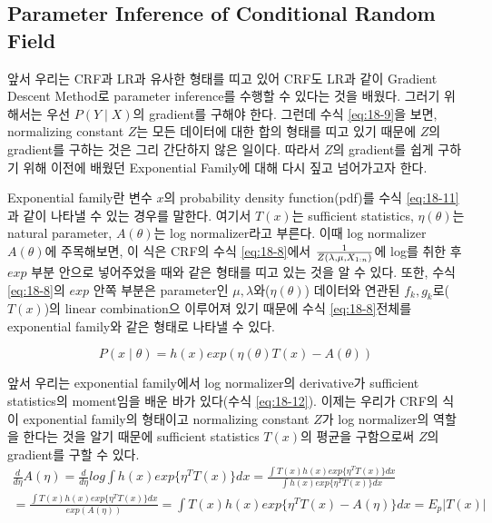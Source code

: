 \documentclass[draft=false]{oblivoir}
\begin{document}
\subsection{Parameter Inference of Conditional Random Field}
앞서 우리는 CRF과 LR과 유사한 형태를 띠고 있어 CRF도 LR과 같이 Gradient Descent Method로 parameter inference를 수행할 수 있다는 것을 배웠다. 그러기 위해서는 우선 $P(Y\mid X)$의 gradient를 구해야 한다. 그런데 수식 \ref{eq:18-9}을 보면, normalizing constant $Z$는 모든 데이터에 대한 합의 형태를 띠고 있기 때문에 $Z$의 gradient를 구하는 것은 그리 간단하지 않은 일이다. 따라서 $Z$의 gradient를 쉽게 구하기 위해 이전에 배웠던 Exponential Family에 대해 다시 짚고 넘어가고자 한다. 

Exponential family란 변수 $x$의 probability density function(pdf)를 수식 \ref{eq:18-11}과 같이 나타낼 수 있는 경우를 말한다. 여기서 $T(x)$는 sufficient statistics, $\eta(\theta)$는 natural parameter, $A(\theta)$는 log normalizer라고 부른다. 이때 log normalizer $A(\theta)$에 주목해보면, 이 식은 CRF의 수식 \ref{eq:18-8}에서 ${1 \over Z(\lambda,\mu,X_{1:n})}$에 log를 취한 후 $exp$ 부분 안으로 넣어주었을 때와 같은 형태를 띠고 있는 것을 알 수 있다. 또한, 수식 \ref{eq:18-8}의 $exp$ 안쪽 부분은 parameter인 $\mu,\lambda$와($\eta(\theta)$) 데이터와 연관된 $f_k,g_k$로($T(x)$)의 linear combination으 이루어져 있기 때문에 수식 \ref{eq:18-8}전체를 exponential family와 같은 형태로 나타낼 수 있다. 

\begin{equation}
	P(x\mid \theta) = h(x) exp(\eta(\theta) T(x)-A(\theta))
\label{eq:18-11}
\end{equation}

앞서 우리는 exponential family에서 log normalizer의 derivative가 sufficient statistics의 moment임을 배운 바가 있다(수식 \ref{eq:18-12}). 이제는 우리가 CRF의 식이 exponential family의 형태이고 normalizing constant $Z$가 log normalizer의 역할을 한다는 것을 알기 때문에 sufficient statistics $T(x)$의 평균을 구함으로써 $Z$의 gradient를 구할 수 있다.
\begin{eqnarray}
\frac{d}{d\eta}A(\eta)  = 
\frac{d}{d\eta}log\int h(x)exp\{\eta^{T}T(x)\}dx = \frac{\int T(x)h(x)exp\{\eta^{T}T(x)\}dx}{\int h(x)exp\{\eta^{T}T(x)\}dx}\nonumber\\
 =  \frac{\int T(x)h(x)exp\{\eta^{T}T(x)\}dx}{exp(A(\eta))}=\int T(x)h(x)exp\{\eta^{T}T(x)-A(\eta)\}dx = E_{p}|T(x)|\nonumber\\
\label{eq:18-12}
\end{eqnarray}
\end{document}
